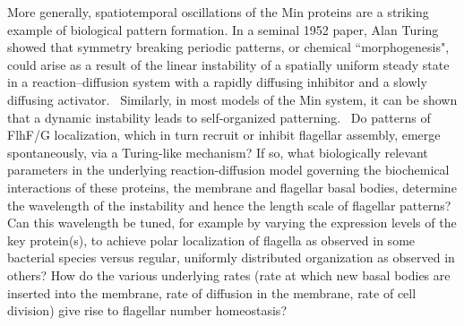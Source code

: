 More generally, spatiotemporal oscillations of the Min proteins are a striking example of biological pattern formation. In a seminal 1952 paper, Alan Turing showed that symmetry breaking periodic patterns, or chemical ``morphogenesis", could arise as a result of the linear instability of a spatially uniform steady state in a reaction–diffusion system with a rapidly diffusing inhibitor and a slowly diffusing activator.~\cite{Turing1952}  Similarly, in most models of the Min system, it can be shown that a dynamic instability leads to self-organized patterning.~\cite {Kondo2018} Do patterns of FlhF/G localization, which in turn recruit or inhibit flagellar assembly, emerge spontaneously, via a Turing-like mechanism?  If so, what biologically relevant parameters in the underlying reaction-diffusion model governing the biochemical interactions of these proteins, the membrane and flagellar basal bodies, determine the wavelength of the instability and hence the length scale of flagellar patterns?  Can this wavelength be tuned, for example by varying the expression levels of the key protein(s), to achieve polar localization of flagella as observed in some bacterial species versus regular, uniformly distributed organization as observed in others?  How do the various underlying rates (rate at which new basal bodies are inserted into the membrane, rate of diffusion in the membrane, rate of cell division) give rise to flagellar number homeostasis? 



